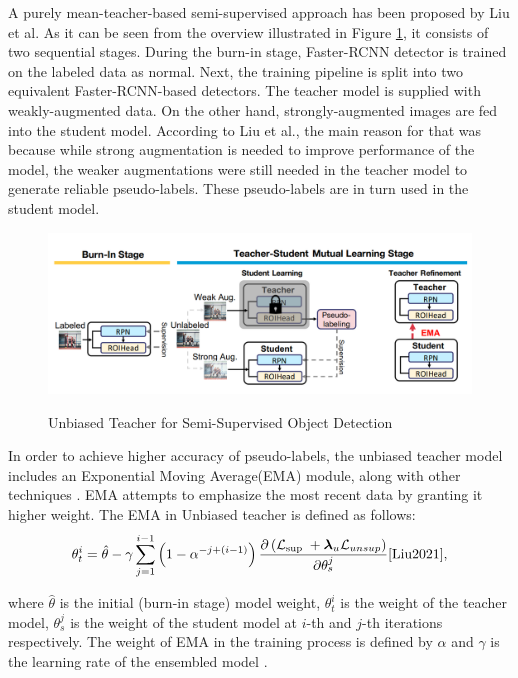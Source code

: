 \documentclass[english, 12pt, a4paper, elec, utf8, a-1b, online]{aaltothesis}
\begin{document}
A purely mean-teacher-based semi-supervised approach has been proposed by Liu et al.\cite{Liu2021} As it can be seen from the overview illustrated in Figure \ref{unbiased}, it consists of two sequential stages. During the burn-in stage, Faster-RCNN detector is trained on the labeled data as normal. Next, the training pipeline is split into two equivalent Faster-RCNN-based detectors. The teacher model is supplied with weakly-augmented data. On the other hand, strongly-augmented images are fed into the student model. According to Liu et al., the main reason for that was because while strong augmentation is needed to improve performance of the model, the weaker augmentations were still needed in the teacher model to generate reliable pseudo-labels. These pseudo-labels are in turn used in the student model. 
\begin{figure}[htb]
	\begin{center}
		\includegraphics[width=14cm]{./unbiased.png}
	\end{center}
	\caption{Unbiased Teacher for Semi-Supervised Object Detection\cite{Liu2021}}
	\begin{center}
		\label{unbiased}
	\end{center}
\end{figure}
\FloatBarrier

In order to achieve higher accuracy of pseudo-labels, the unbiased teacher model includes an Exponential Moving Average(EMA) module, along with other techniques \cite{Liu2021}. EMA attempts to emphasize the most recent data by granting it higher weight. The EMA in Unbiased teacher is defined as follows: 
\begin{equation}
\theta_{t}^{i}=\hat{\theta}-\gamma \sum_{j=1}^{i-1}\left(1-\alpha^{-j+(i-1)}\right) \frac{\partial\left(\mathcal{L}_{\text {sup }}+\boldsymbol{\lambda}_{u} \mathcal{L}_{u n s u p}\right)}{\partial \theta_{s}^{j}}
\label{EMA}
\cite{Liu2021},
\end{equation}

where $\hat{\theta}$ is the initial (burn-in stage) model weight, $\theta_{t}^{i}$ is the weight of the teacher model, $\theta_{s}^{j}$ is the weight of the student model  at $i$-th and $j$-th iterations respectively. The weight of EMA in the training process is defined by $\alpha$ and $\gamma$ is the learning rate of the ensembled model \cite{Liu2021}.
\end{document}
